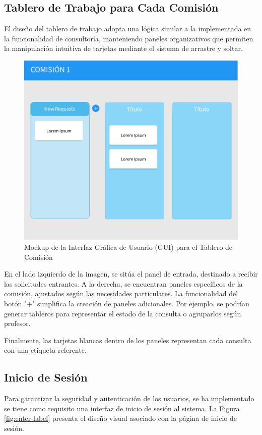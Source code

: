 \subsection{Tablero de Trabajo para Cada Comisión}

El diseño del tablero de trabajo adopta una lógica similar a la implementada en la funcionalidad de consultoría, manteniendo paneles organizativos que permiten la manipulación intuitiva de tarjetas mediante el sistema de arrastre y soltar.


\begin{figure}[H]
\centering
\includegraphics[width=1\linewidth]{fig/board.png}
\caption{Mockup de la Interfaz Gráfica de Usuario (GUI) para el Tablero de Comisión}
\label{fig:board}
\end{figure}


En el lado izquierdo de la imagen, se sitúa el panel de entrada, destinado a recibir las solicitudes entrantes. A la derecha, se encuentran paneles específicos de la comisión, ajustados según las necesidades particulares. La funcionalidad del botón "+" simplifica la creación de paneles adicionales. Por ejemplo, se podrían generar tableros para representar el estado de la consulta o agruparlos según profesor.

Finalmente, las tarjetas blancas dentro de los paneles representan cada consulta con una etiqueta referente.


\subsection{Inicio de Sesión}
Para garantizar la seguridad y autenticación de los usuarios, se ha implementado se tiene como requisito una interfaz de inicio de sesión al sistema. La Figura \ref{fig:enter-label} presenta el diseño visual asociado con la página de inicio de sesión.

